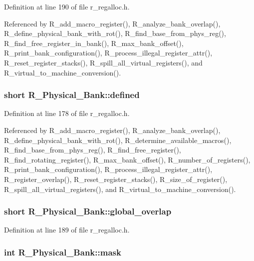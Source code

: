 Definition at line 190 of file r\_\-regalloc.h.

Referenced by R\_\-add\_\-macro\_\-register(), R\_\-analyze\_\-bank\_\-overlap(), R\_\-define\_\-physical\_\-bank\_\-with\_\-rot(), R\_\-find\_\-base\_\-from\_\-phys\_\-reg(), R\_\-find\_\-free\_\-register\_\-in\_\-bank(), R\_\-max\_\-bank\_\-offset(), R\_\-print\_\-bank\_\-configuration(), R\_\-process\_\-illegal\_\-register\_\-attr(), R\_\-reset\_\-register\_\-stacks(), R\_\-spill\_\-all\_\-virtual\_\-registers(), and R\_\-virtual\_\-to\_\-machine\_\-conversion().
\subsubsection{\setlength{\rightskip}{0pt plus 5cm}short \bf{R\_\-Physical\_\-Bank::defined}}\label{structR__Physical__Bank_2a6544d63fa9ff99ee09a169dfeb7cf9}




Definition at line 178 of file r\_\-regalloc.h.

Referenced by R\_\-add\_\-macro\_\-register(), R\_\-analyze\_\-bank\_\-overlap(), R\_\-define\_\-physical\_\-bank\_\-with\_\-rot(), R\_\-determine\_\-available\_\-macros(), R\_\-find\_\-base\_\-from\_\-phys\_\-reg(), R\_\-find\_\-free\_\-register(), R\_\-find\_\-rotating\_\-register(), R\_\-max\_\-bank\_\-offset(), R\_\-number\_\-of\_\-registers(), R\_\-print\_\-bank\_\-configuration(), R\_\-process\_\-illegal\_\-register\_\-attr(), R\_\-register\_\-overlap(), R\_\-reset\_\-register\_\-stacks(), R\_\-size\_\-of\_\-register(), R\_\-spill\_\-all\_\-virtual\_\-registers(), and R\_\-virtual\_\-to\_\-machine\_\-conversion().
\subsubsection{\setlength{\rightskip}{0pt plus 5cm}short \bf{R\_\-Physical\_\-Bank::global\_\-overlap}}\label{structR__Physical__Bank_f92be8cca3512fccd4751a8bc153f6c0}




Definition at line 189 of file r\_\-regalloc.h.
\subsubsection{\setlength{\rightskip}{0pt plus 5cm}int \bf{R\_\-Physical\_\-Bank::mask}}\label{structR__Physical__Bank_b4d4ad7ff5c5dfa24386165515652e46}




